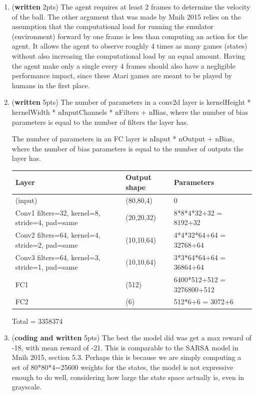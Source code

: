 \documentclass{article}
\begin{document}
\begin{enumerate}
\item (\textbf{written} 2pts) The agent requires at least 2 frames to determine the velocity of the ball. The other argument that was made by Mnih 2015 relies on the assumption that the computational load for running the emulator (environment) forward by one frame is less than computing an action for the agent. It allows the agent to observe roughly 4 times as many games (states) without also increasing the computational load by an equal amount. Having the agent make only a single every 4 frames should also have a negligible performance impact, since these Atari games are meant to be played by humans in the first place.

\item (\textbf{written} 5pts) The number of parameters in a conv2d layer is kernelHeight * kernelWidth * nInputChannels * nFilters + nBias, where the number of bias parameters is equal to the number of filters the layer has.

The number of parameters in an FC layer is nInput * nOutput + nBias, where the number of bias parameters is equal to the number of outputs the layer has.
\begin{center}
	\begin{tabular}{ | l | l | l |}  
		\hline
		Layer & Output shape & Parameters \\ \hline
		(input) & (80,80,4) & 0 \\ \hline
		Conv1 filters=32, kernel=8, stride=4, pad=same & (20,20,32) & 8*8*4*32+32 = 8192+32 \\ \hline
		Conv2 filters=64, kernel=4, stride=2, pad=same & (10,10,64) & 4*4*32*64+64 = 32768+64 \\ \hline
		Conv3 filters=64, kernel=3, stride=1, pad=same & (10,10,64) & 3*3*64*64+64 = 36864+64 \\ \hline
		FC1 & (512) & 6400*512+512 = 3276800+512 \\ \hline
		FC2 & (6) &  512*6+6 = 3072+6 \\ \hline
	\end{tabular}
\end{center}
Total = 3358374


\item (\textbf{coding and written} 5pts) The best the model did was get a max reward of -18, with mean reward of -21. This is comparable to the SARSA model in Mnih 2015, section 5.3. Perhaps this is because we are simply computing a set of 80*80*4=25600 weights for the states, the model is not expressive enough to do well, considering how large the state space actually is, even in grayscale.


\end{enumerate}
\end{document}

